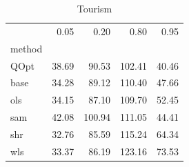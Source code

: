\begin{table}
\caption{Tourism}
\label{ }
\begin{tabular}{lrrrr}
\toprule
 & 0.05 & 0.20 & 0.80 & 0.95 \\
method &  &  &  &  \\
\midrule
QOpt & 38.69 & 90.53 & 102.41 & 40.46 \\
base & 34.28 & 89.12 & 110.40 & 47.66 \\
ols & 34.15 & 87.10 & 109.70 & 52.45 \\
sam & 42.08 & 100.94 & 111.05 & 44.41 \\
shr & 32.76 & 85.59 & 115.24 & 64.34 \\
wls & 33.37 & 86.19 & 123.16 & 73.53 \\
\bottomrule
\end{tabular}
\end{table}
